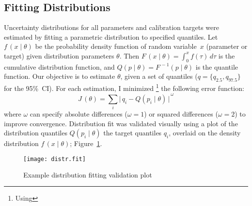 \subsection{Fitting Distributions}\label{app.model.math.fit}
Uncertainty distributions for all parameters and calibration targets were estimated by
fitting a parametric distribution to specified quantiles.
Let $f\,(x\mid\theta)$ be
the probability density function of random variable~$x$ (parameter or target)
given distribution parameters $\theta$.
Then $F\,(x\mid\theta) = \int_0^x f(\tau)\,d\tau$ is the cumulative distribution function,
and $Q(p\mid\theta) = F^{\,-1}(p\mid\theta)$ is the quantile function.
Our objective is to estimate $\theta$, given a set of quantiles
(\eg $q = \{q_{2.5},q_{97.5}\}$ for the 95\%~CI).
For each estimation, I minimized%
\footnote{Using }
the following error function:
\begin{equation}
  J\,(\theta) = \sum_i {\big|\,q_i - Q(p_i\mid\theta)\,\big|}^{\,\omega}
\end{equation}
where $\omega$ can specify absolute differences ($\omega=1$) or squared differences ($\omega=2$)
to improve convergence.
Distribution fit was validated visually using a plot of
the distribution quantiles $Q(p_i\mid\theta)$ \vs the target quantiles $q_i$,
overlaid on the density distribution $f\,(x\mid\theta)$; \eg Figure~\ref{fig:distr.fit}.
\begin{figure}[h]
  \centering
  \texttt{[image: distr.fit]}
  \caption{Example distribution fitting validation plot}
  \label{fig:distr.fit}
\end{figure}
